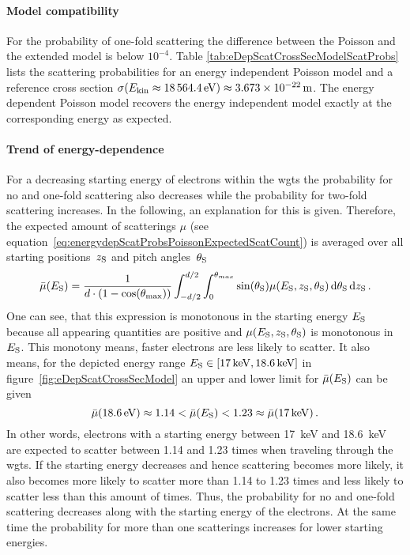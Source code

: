 \paragraph{Model compatibility}
For the probability of one-fold scattering the difference between the Poisson and the extended model is below $10^{-4}$. Table \ref{tab:eDepScatCrossSecModelScatProbs} lists the scattering probabilities for an energy independent Poisson model and a reference cross section $\sigma(E_\mathrm{kin}\approx\SI{18564.4}{eV})\approx\SI{3.673e-22}{m}$. The energy dependent Poisson model recovers the energy independent model exactly at the corresponding energy as expected.

\paragraph{Trend of energy-dependence}
For a decreasing starting energy of electrons within the \gls{wgts} the probability for no and one-fold scattering also decreases while the probability for two-fold scattering increases. In the following, an explanation for this is given. Therefore, the expected amount of scatterings $\mu$ (see equation~\ref{eq:energydepScatProbsPoissonExpectedScatCount}) is averaged over all starting positions~$z_\mathrm{S}$ and pitch angles~$\theta_\mathrm{S}$
\begin{equation}
    \bar{\mu}(E_\mathrm{S}) = 
      \frac{1}{d \cdot (1-\cos(\theta_\mathrm{max}))} 
      \int_{-d/2}^{d/2}  
          \int_{0}^{\theta_{max}} 
            \sin(\theta_\mathrm{S})
            \mu(E_\mathrm{S},z_\mathrm{S},\theta_\mathrm{S})
          \mathop{}\!\mathrm{d}\theta_\mathrm{S}
      \mathop{}\!\mathrm{d}z_\mathrm{S}
      \text{\,.}
\end{equation}
One can see, that this expression is monotonous in the starting energy $E_\mathrm{S}$ because all appearing quantities are positive and $\mu(E_\mathrm{S},z_\mathrm{S},\theta_\mathrm{S})$ is monotonous in $E_\mathrm{S}$. This monotony means, faster electrons are less likely to scatter. It also means, for the depicted energy range $E_\mathrm{S} \in [\SI{17}{keV}, \SI{18.6}{keV}]$ in figure~\ref{fig:eDepScatCrossSecModel} an upper and lower limit for $\bar{\mu}(E_\mathrm{S})$ can be given
\begin{equation}
	\bar{\mu}(\SI{18.6}{eV}) \approx 1.14 < 
	\bar{\mu}(E_\mathrm{S}) < 
	1.23 \approx \bar{\mu}(\SI{17}{keV})
	\text{\,.}
\end{equation}
In other words, electrons with a starting energy between \SI{17}{keV} and \SI{18.6}{keV} are expected to scatter between 1.14 and 1.23 times when traveling through the \gls{wgts}. If the starting energy decreases and hence scattering becomes more likely, it also becomes more likely to scatter more than 1.14 to 1.23 times and less likely to scatter less than this amount of times. Thus, the probability for no and one-fold scattering decreases along with the starting energy of the electrons. At the same time the probability for more than one scatterings increases for lower starting energies. 

